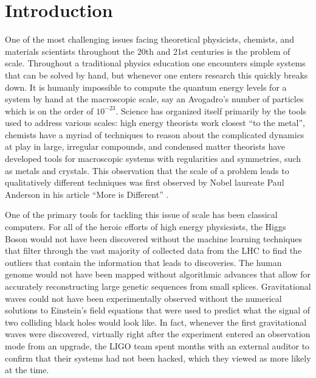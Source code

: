 \chapter{Introduction}

One of the most challenging issues facing theoretical physicists, chemists, and materials scientists throughout the 20th and 21st centuries is the problem of scale. Throughout a traditional physics education one encounters simple systems that can be solved by hand, but whenever one enters research this quickly breaks down. It is humanly impossible to compute the quantum energy levels for a system by hand at the macroscopic scale, say an Avogadro's number of particles which is on the order of $10^{-23}$. Science has organized itself primarily by the tools used to address various scales: high energy theorists work closest ``to the metal'', chemists have a myriad of techniques to reason about the complicated dynamics at play in large, irregular compounds, and condensed matter theorists have developed tools for macroscopic systems with regularities and symmetries, such as metals and crystals. This observation that the scale of a problem leads to qualitatively different techniques was first observed by Nobel laureate Paul Anderson in his article ``More is Different'' \cite{moreIsDifferent}.

One of the primary tools for tackling this issue of scale has been classical computers. For all of the heroic efforts of high energy physicsists, the Higgs Boson would not have been discovered without the machine learning techniques that filter through the vast majority of collected data from the LHC to find the outliers that contain the information that leads to discoveries. The human genome would not have been mapped without algorithmic advances that allow for accurately reconstructing large genetic sequences from small splices. Gravitational waves could not have been experimentally observed without the numerical solutions to Einstein's field equations that were used to predict what the signal of two colliding black holes would look like. In fact, whenever the first gravitational waves were discovered, virtually right after the experiment entered an observation mode from an upgrade, the LIGO team spent months with an external auditor to confirm that their systems had not been hacked, which they viewed as more likely at the time. 

